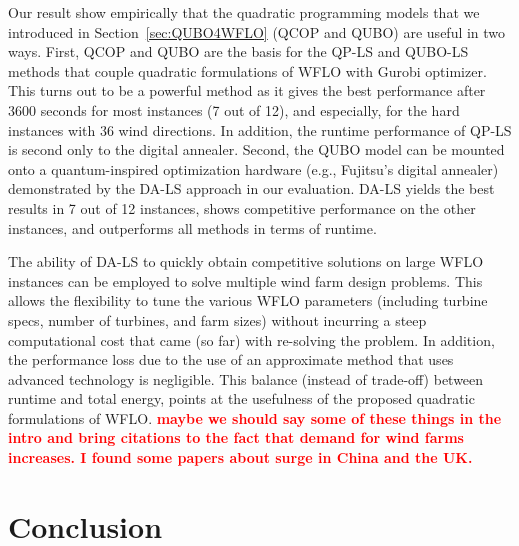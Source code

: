 \documentclass[preprint,12pt]{elsarticle}
\newcommand{\todo}[1]{{\textcolor{red}{\bf {#1}}}}
\begin{document}
Our result show empirically that the quadratic programming models that we
introduced in Section~\ref{sec:QUBO4WFLO} (QCOP and QUBO) are useful in two ways.
First, QCOP and QUBO are the basis for the QP-LS and QUBO-LS methods that couple
quadratic formulations of WFLO with Gurobi optimizer. This turns out
to be a powerful method as it gives the best performance after 3600 seconds for most instances (7 out of 12),
and especially,
for the hard instances with 36 wind directions. In addition, the runtime performance of QP-LS is second
only to the digital annealer.  
Second, the QUBO model can be mounted onto a quantum-inspired optimization hardware (e.g., Fujitsu's digital annealer) demonstrated by the DA-LS approach in our evaluation. DA-LS yields the best results in 7 out of 12 
instances, shows competitive performance on the other instances, and outperforms all methods in terms of runtime.

 
The ability of DA-LS to quickly obtain competitive solutions on large WFLO instances 
can be employed to solve
multiple wind farm design problems. This allows the flexibility to tune the various WFLO parameters (including turbine specs, number of turbines, and farm sizes) without incurring a steep computational cost that came
(so far) with re-solving the problem. In addition, the performance loss due to the use of an approximate method 
that uses advanced technology is negligible. This balance (instead of trade-off) between
runtime and total energy, points at the usefulness of the proposed quadratic formulations of WFLO.  \todo{maybe we should say some of these things in the intro and bring citations to the fact that demand for wind farms increases. I found some papers about surge in China and the UK.}
 


  
\section{Conclusion}
\label{sec:conclusion}
\end{document}
